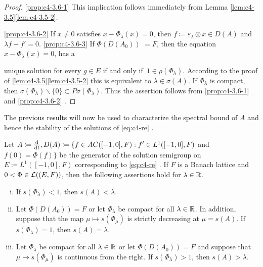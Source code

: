 \begin{proof}
\ref{prop:c4-3.6-1} 
This implication follows immediately from Lemma \ref{lem:c4-3.5}\ref{lem:c4-3.5-2}.

\ref{prop:c4-3.6-2} 
If $x \neq 0$ satisfies $x - \Phi_{\lambda}(x) = 0$, then $f \coloneq  \varepsilon_{\lambda} \otimes x \in D(A)$ and $\lambda f - f' = 0$.
\ref{prop:c4-3.6-3} 
If $\Phi(D(A_{0}))$ $= F$,  then the equation $x - \Phi_{\lambda}(x) = 0$, has a


  unique solution for every $g \in E$ if and only if\, $1 \in \rho(\Phi_{\lambda})$. 
According to the proof of \ref{lem:c4-3.5}\ref{lem:c4-3.5-2} this is equivalent to $\lambda \in \sigma(A)$.
If $\Phi_{\lambda}$ is compact, then $\sigma(\Phi_{\lambda})\backslash\{0\} \subset P\sigma(\Phi_{\lambda})$. Thus the assertion follows from \ref{prop:c4-3.6-1} and \ref{prop:c4-3.6-2} .
\end{proof}

The previous results will now be used to characterize the spectral bound of $A$ and hence the stability of the solutions of \eqref{eq:c4-re} .

\begin{theorem}\label{thm:c4-3.7}
Let $A \coloneqq \frac{\mathop{}\!\mathrm{d}{}}{\mathop{}\!\mathrm{d}{t}}, D(A) \coloneqq \{f \in AC([-1,0],F) : f' \in L^{1}([-1,0],F)$ and $f(0) = \Phi(f)\}$ be the generator of the solution semigroup on $E \coloneqq L^{1}([-1,0],F)$ corresponding to \eqref{eq:c4-re} . If $F$ is a Banach lattice and $0 < \Phi \in \mathcal{L}((E,F))$, then the following assertions hold for $\lambda \in \mathbb{R}$.
\begin{enumerate}[(i)]
\item \label{thm:c4-3.7-1}
If $s(\Phi_{\lambda}) < 1$, then $s(A) < \lambda$.
\item \label{thm:c4-3.7-2}
Let $\Phi(D(A_{0})) = F$ or let $\Phi_{\lambda}$ be compact for all $\lambda \in \mathbb{R}$. 
In addition, suppose that the map $\mu \mapsto s(\Phi_\mu)$ is strictly decreasing at $\mu = s(A)$. If $s(\Phi_{\lambda}) = 1$, then $s(A) = \lambda$.
\item \label{thm:c4-3.7-3}
Let $\Phi_{\lambda}$ be compact for all $\lambda \in \mathbb{R}$ or let $\Phi(D(A_{0})) = F$ and suppose that $\mu \mapsto s(\Phi_\mu)$ is continuous from the right. 
If $s(\Phi_{\lambda}) > 1$, then $s(A) > \lambda$.
\end{enumerate}
\end{theorem}

